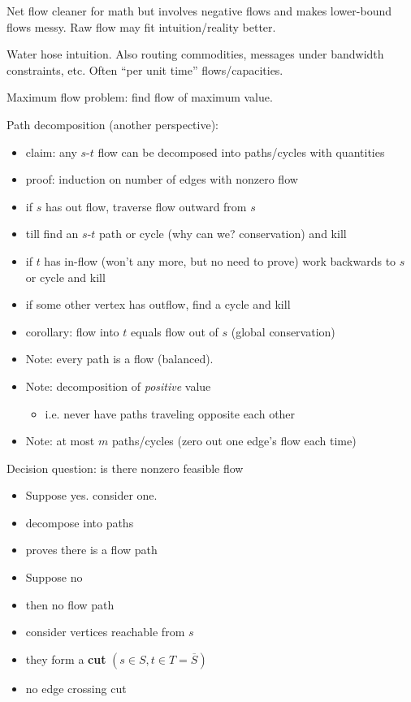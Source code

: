\documentclass{article}
\begin{document}
Net flow cleaner for math but involves negative flows and makes
lower-bound flows messy.  Raw flow may
fit intuition/reality better.

Water hose intuition.  Also routing commodities, messages under
bandwidth constraints, etc.  Often ``per unit time'' flows/capacities.

Maximum flow problem: find flow of maximum value.


Path decomposition (another perspective):
\begin{itemize}
\item claim: any $s$-$t$ flow can be decomposed into paths/cycles with quantities
\item proof: induction on number of edges with nonzero flow
\item if $s$ has out flow, traverse flow outward from $s$
\item till find an $s$-$t$ path or cycle (why can we?
  conservation) and kill
\item if $t$ has in-flow (won't any more, but no need to prove) work
  backwards to $s$ or cycle and kill
\item if some other vertex has outflow, find a cycle and kill
\item corollary: flow into $t$ equals flow out of $s$ (global
  conservation)
\item Note: every path is a flow (balanced).
\item Note: decomposition of \emph{positive} value
  \begin{itemize}
  \item i.e. never have paths traveling opposite each other
  \end{itemize}
\item Note: at most $m$ paths/cycles (zero out one edge's flow each time)
\end{itemize}



Decision question: is there nonzero feasible flow
\begin{itemize}
\item Suppose yes.  consider one.
\item decompose into paths
\item proves there is a flow path
\item Suppose no
\item then no flow path
\item consider vertices reachable from $s$
\item they form a \textbf{cut} $(s\in S, t \in T={\overline S})$
\item no edge crossing cut
\end{itemize}
\end{document}
